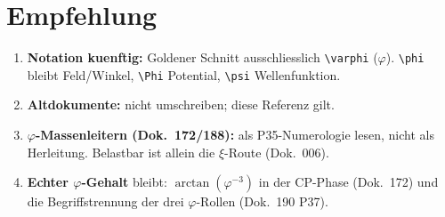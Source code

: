 \section{Empfehlung}

\begin{enumerate}
  \item \textbf{Notation kuenftig:} Goldener Schnitt ausschliesslich
        \verb|\varphi| ($\varphi$). \verb|\phi| bleibt Feld/Winkel,
        \verb|\Phi| Potential, \verb|\psi| Wellenfunktion.
  \item \textbf{Altdokumente:} nicht umschreiben; diese Referenz gilt.
  \item \textbf{$\varphi$-Massenleitern (Dok.~172/188):} als P35-Numerologie
        lesen, nicht als Herleitung. Belastbar ist allein die $\xi$-Route
        (Dok.~006).
  \item \textbf{Echter $\varphi$-Gehalt} bleibt: $\arctan(\varphi^{-3})$ in der
        CP-Phase (Dok.~172) und die Begriffstrennung der drei $\varphi$-Rollen
        (Dok.~190 P37).
\end{enumerate}
